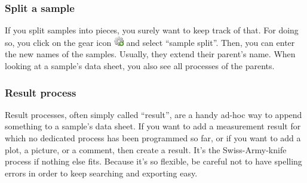 \documentclass[a4paper,11pt,english]{sphinxmanual}
\begin{document}

\subsubsection{Split a sample}
\label{demo:split-a-sample}\label{demo:index-8}
If you split samples into pieces, you surely want to keep track of that.  For
doing so, you click on the gear icon \includegraphics{cog_add.png} and select “sample split”.
Then, you can enter the new names of the samples.  Usually, they extend their
parent's name.  When looking at a sample's data sheet, you also see all
processes of the parents.


\subsubsection{Result process}
\label{demo:index-9}\label{demo:result-process}
Result processes, often simply called “result”, are a handy ad-hoc way to
append something to a sample's data sheet.  If you want to add a measurement
result for which no dedicated process has been programmed so far, or if you
want to add a plot, a picture, or a comment, then create a result.  It's the
Swiss-Army-knife process if nothing else fits.  Because it's so flexible, be
careful not to have spelling errors in order to keep searching and exporting
easy.

\end{document}
